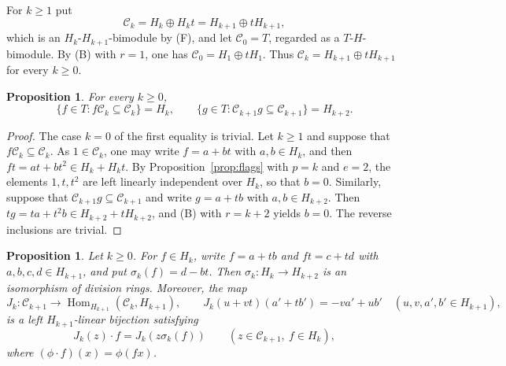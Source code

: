 \documentclass[11pt,a4paper]{amsart}
\newtheorem{proposition}[theorem]{Proposition}
\numberwithin{equation}{section}
\newcommand{\Hom}{\operatorname{Hom}}
\newcommand{\C}{\mathcal{C}}
\begin{document}
For $k\ge1$ put
\[
\C_k=H_k\oplus H_kt=H_{k+1}\oplus tH_{k+1},
\]
which is an $H_k$-$H_{k+1}$-bimodule by (F), and let $\C_0=T$, regarded as a $T$-$H$-bimodule. By (B) with $r=1$, one has $\C_0=H_1\oplus tH_1$. Thus $\C_k=H_{k+1}\oplus tH_{k+1}$ for every $k\ge0$.

\begin{proposition}\label{prop:stab}
For every $k\ge0$,
\[
\{f\in T: f\C_k\subseteq\C_k\}=H_k,\qquad \{g\in T:\C_{k+1}g\subseteq\C_{k+1}\}=H_{k+2}.
\]
\end{proposition}

\begin{proof}
The case $k=0$ of the first equality is trivial. Let $k\ge1$ and suppose that $f\C_k\subseteq\C_k$. As $1\in\C_k$, one may write $f=a+bt$ with $a,b\in H_k$, and then $ft=at+bt^2\in H_k+H_kt$. By Proposition~\ref{prop:flags} with $p=k$ and $e=2$, the elements $1,t,t^2$ are left linearly independent over $H_k$, so that $b=0$. Similarly, suppose that $\C_{k+1}g\subseteq\C_{k+1}$ and write $g=a+tb$ with $a,b\in H_{k+2}$. Then $tg=ta+t^2b\in H_{k+2}+tH_{k+2}$, and (B) with $r=k+2$ yields $b=0$. The reverse inclusions are trivial.
\end{proof}

\begin{proposition}\label{prop:recip}
Let $k\ge0$. For $f\in H_k$, write $f=a+tb$ and $ft=c+td$ with $a,b,c,d\in H_{k+1}$, and put $\sigma_k(f)=d-bt$. Then $\sigma_k\colon H_k\to H_{k+2}$ is an isomorphism of division rings. Moreover, the map
\[
J_k\colon\C_{k+1}\to\Hom_{H_{k+1}}(\C_k,H_{k+1}),\qquad J_k(u+vt)(a'+tb')=-va'+ub'\quad(u,v,a',b'\in H_{k+1}),
\]
is a left $H_{k+1}$-linear bijection satisfying
\begin{equation}\label{eq:twist}
J_k(z)\cdot f=J_k(z\sigma_k(f))\qquad(z\in\C_{k+1},\ f\in H_k),
\end{equation}
where $(\phi\cdot f)(x)=\phi(fx)$.
\end{proposition}
\end{document}
